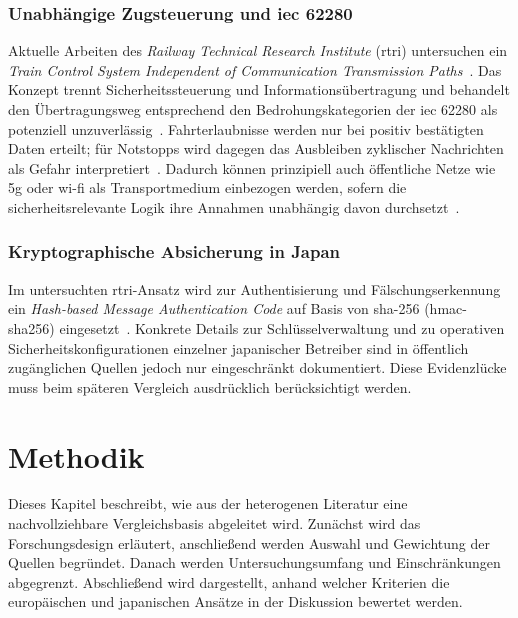 \documentclass[runningheads]{res/llncs}
\begin{document}
\subsubsection{\texorpdfstring{Unabhängige Zugsteuerung und \gls{iec} 62280}{Unabhängige Zugsteuerung und IEC 62280}}
\label{sec:Unabhängige_Zugsteuerung_und_IEC_62280}
Aktuelle Arbeiten des \textit{Railway Technical Research Institute} (\gls{rtri}) untersuchen ein \textit{Train Control System Independent of Communication Transmission Paths}~\parencite[S. 1--3]{iwamotoTrain2024}. Das Konzept trennt Sicherheitssteuerung und Informationsübertragung und behandelt den Übertragungsweg entsprechend den Bedrohungskategorien der \gls{iec} 62280 als potenziell unzuverlässig~\parencite[S. 1, 4, 7]{iwamotoTrain2024}. Fahrterlaubnisse werden nur bei positiv bestätigten Daten erteilt; für Notstopps wird dagegen das Ausbleiben zyklischer Nachrichten als Gefahr interpretiert~\parencite[S. 10--12]{iwamotoTrain2024}. Dadurch können prinzipiell auch öffentliche Netze wie \gls{5g} oder \gls{wi-fi} als Transportmedium einbezogen werden, sofern die sicherheitsrelevante Logik ihre Annahmen unabhängig davon durchsetzt~\parencite[S. 3, 10]{iwamotoTrain2024}.

\subsubsection{Kryptographische Absicherung in Japan}
\label{sec:Kryptographische_Absicherung_in_Japan}
Im untersuchten \gls{rtri}-Ansatz wird zur Authentisierung und Fälschungserkennung ein \textit{Hash-based Message Authentication Code} auf Basis von \gls{sha-256} (\gls{hmac-sha256}) eingesetzt~\parencite[S. 12]{iwamotoTrain2024}. Konkrete Details zur Schlüsselverwaltung und zu operativen Sicherheitskonfigurationen einzelner japanischer Betreiber sind in öffentlich zugänglichen Quellen jedoch nur eingeschränkt dokumentiert. Diese Evidenzlücke muss beim späteren Vergleich ausdrücklich berücksichtigt werden.

\section{Methodik}
\label{sec:Methodik}

Dieses Kapitel beschreibt, wie aus der heterogenen Literatur eine nachvollziehbare Vergleichsbasis abgeleitet wird. Zunächst wird das Forschungsdesign erläutert, anschließend werden Auswahl und Gewichtung der Quellen begründet. Danach werden Untersuchungsumfang und Einschränkungen abgegrenzt. Abschließend wird dargestellt, anhand welcher Kriterien die europäischen und japanischen Ansätze in der Diskussion bewertet werden.
\end{document}
